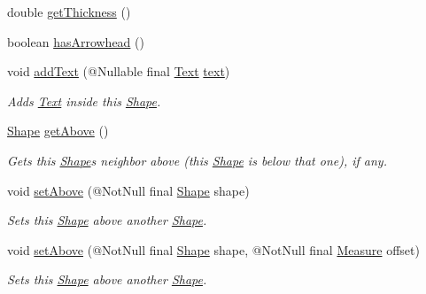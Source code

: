 \begin{DoxyCompactItemize}
\item 
double \hyperlink{classcom_1_1aarrelaakso_1_1drawl_1_1_line_aa25b4985b90dd7ebad4cbdc403f22a42}{get\+Thickness} ()
\item 
boolean \hyperlink{classcom_1_1aarrelaakso_1_1drawl_1_1_line_a422ac149cee14f3123989e44477d78d2}{has\+Arrowhead} ()
\item 
void \hyperlink{classcom_1_1aarrelaakso_1_1drawl_1_1_shape_af6fea9610721de462c18ee640043aba7}{add\+Text} (@Nullable final \hyperlink{classcom_1_1aarrelaakso_1_1drawl_1_1_text}{Text} \hyperlink{classcom_1_1aarrelaakso_1_1drawl_1_1_shape_ab54afc2d95d3447532f5ecf3fec3faa8}{text})
\begin{DoxyCompactList}\small\item\em Adds \hyperlink{classcom_1_1aarrelaakso_1_1drawl_1_1_text}{Text} inside this \hyperlink{classcom_1_1aarrelaakso_1_1drawl_1_1_shape}{Shape}. \end{DoxyCompactList}\item 
\hyperlink{classcom_1_1aarrelaakso_1_1drawl_1_1_shape}{Shape} \hyperlink{classcom_1_1aarrelaakso_1_1drawl_1_1_shape_acebea2aa57031322323c9bf50ee447db}{get\+Above} ()
\begin{DoxyCompactList}\small\item\em Gets this \hyperlink{classcom_1_1aarrelaakso_1_1drawl_1_1_shape}{Shape}\textquotesingle{}s neighbor above (this \hyperlink{classcom_1_1aarrelaakso_1_1drawl_1_1_shape}{Shape} is below that one), if any. \end{DoxyCompactList}\item 
void \hyperlink{classcom_1_1aarrelaakso_1_1drawl_1_1_shape_a4deb22d64fef2115a0bc4802e8dba682}{set\+Above} (@Not\+Null final \hyperlink{classcom_1_1aarrelaakso_1_1drawl_1_1_shape}{Shape} shape)
\begin{DoxyCompactList}\small\item\em Sets this \hyperlink{classcom_1_1aarrelaakso_1_1drawl_1_1_shape}{Shape} above another \hyperlink{classcom_1_1aarrelaakso_1_1drawl_1_1_shape}{Shape}. \end{DoxyCompactList}\item 
void \hyperlink{classcom_1_1aarrelaakso_1_1drawl_1_1_shape_aad0b2fb173c0112b71b06cf90709acc3}{set\+Above} (@Not\+Null final \hyperlink{classcom_1_1aarrelaakso_1_1drawl_1_1_shape}{Shape} shape, @Not\+Null final \hyperlink{classcom_1_1aarrelaakso_1_1drawl_1_1_measure}{Measure} offset)
\begin{DoxyCompactList}\small\item\em Sets this \hyperlink{classcom_1_1aarrelaakso_1_1drawl_1_1_shape}{Shape} above another \hyperlink{classcom_1_1aarrelaakso_1_1drawl_1_1_shape}{Shape}. \end{DoxyCompactList}\item 

\end{DoxyCompactItemize}
